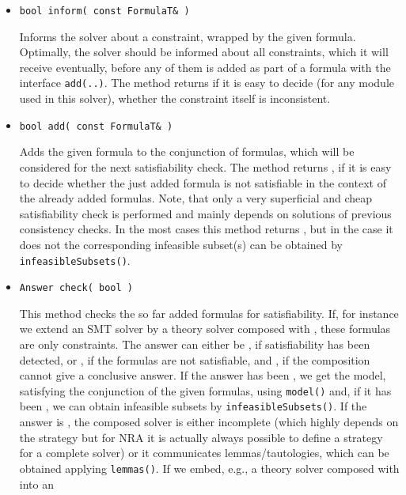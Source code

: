 \begin{itemize}
	\item \begin{verbatim}bool inform( const FormulaT& )\end{verbatim}
		Informs the solver about a constraint, wrapped by the given formula. 
		Optimally, the solver should be informed about all constraints,
        which it will receive eventually, before any of them is added as part of a formula with the 
        interface \texttt{add(..)}. The method returns \false if it is easy to decide (for any module used in this solver), whether 
        the constraint itself is inconsistent.
	\item \begin{verbatim}bool add( const FormulaT& )\end{verbatim}
		Adds the given formula to the conjunction of formulas, which will be considered for the next 
        satisfiability check. The method returns \false, if it is easy to decide whether the just added formula is not satisfiable
        in the context of the already added formulas. Note, that only a very superficial and cheap satisfiability check
        is performed and mainly depends on solutions of previous consistency checks. In the most cases this method returns \true,
        but in the case it does not the corresponding infeasible subset(s) can be obtained by
        \texttt{infeasibleSubsets()}.
    \item \begin{verbatim}Answer check( bool )\end{verbatim}
    	This method checks the so far added formulas for satisfiability. If, for instance we extend an SMT solver
	by a theory solver composed with \smtrat, these formulas are only constraints. The answer can either be
    	\True, if satisfiability has been detected, or 
    	\False, if the formulas are not satisfiable, and \Unknown, if the composition
    	cannot give a conclusive answer. If the answer has been \True, we get the model, satisfying the conjunction
	of the given formulas, using \texttt{model()} and, if it has been \False, we can obtain infeasible subsets by
	\texttt{infeasibleSubsets()}.
	If the answer is \Unknown, the composed solver is either incomplete (which highly depends on the strategy
	but for NRA it is actually always possible to define a strategy for a complete \smtrat solver) or it
	communicates lemmas/tautologies, which can be obtained applying \texttt{lemmas()}. 
	If we embed, e.g., a theory solver composed with \smtrat into an

\end{itemize}
